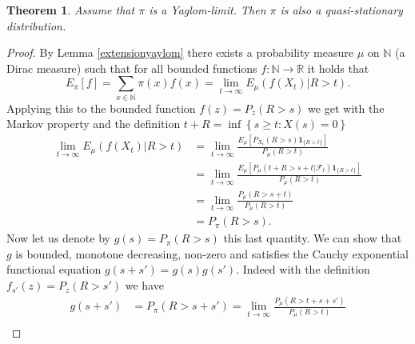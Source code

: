 \documentclass[12pt,a4paper]{scrartcl}
\newtheorem{theorem}{Theorem}[section]
\numberwithin{equation}{section}
\newcommand{\R}{\mathbb{R}} %
\newcommand{\N}{\mathbb{N}} %
\begin{document}
\begin{theorem}
Assume that $\pi$ is a Yaglom-limit. Then $\pi$ is also a quasi-stationary distribution.
\end{theorem}
\begin{proof}
By Lemma \ref{extensionyaylom} there exists a probability measure $\mu$ on $\N$ (a Dirac measure) such that for all bounded functions $f:\N \to \R$ it holds that 
$$ E_{\pi}\left[f\right] = \sum_{x \in \N} \pi\left(x\right) f\left(x\right) = \lim_{t \to \infty} E_{\mu}\left(f\left(X_t\right) | R > t \right). $$
Applying this to the bounded function $f\left(z\right) = P_z\left(R > s\right)$ we get with the Markov property and the definition $ t + R = \inf\left\{ s \geq t : X\left(s\right) = 0 \right\} $
\begin{align*}
\lim_{t \to \infty} E_{\mu} \left(f\left(X_t\right) | R > t \right) &= \lim_{t \to \infty} \frac{E_{\mu}\left[P_{X_t}\left(R > s\right) \textbf{1}_{\lbrace R > t \rbrace} \right]}{P_{\mu}\left(R > t \right)} \\
&= \lim_{t \to \infty} \frac{ E_{\mu} \left[ P_{\mu}\left(t + R > s +t | \mathcal{F}_t \right) \textbf{1}_{\lbrace R > t \rbrace}  \right] }{P_{\mu}\left(R > t \right)} \\
&= \lim_{t \to \infty} \frac{P_{\mu}\left(R > s+ t \right)}{ P_{\mu}\left( R > t\right)} \\
&= P_{\pi}\left( R > s\right).
\end{align*}
Now let us denote by $g\left(s\right) = P_{\pi}\left(R > s\right)$ this last quantity. We can show that $g$ is bounded, monotone decreasing, non-zero and satisfies the Cauchy exponential functional equation $g\left(s + s'\right) = g\left(s\right) g\left(s'\right).$ Indeed with the definition $f_{s'}\left(z\right) = P_{z}\left(R > s' \right) $ we have
\begin{align*}
g\left(s + s' \right) &= P_{\pi}\left( R > s+s'\right) = \lim_{t \to \infty} \frac{P_{\mu}\left(R > t + s + s' \right)}{P_{\mu}\left(R > t \right)} \\

\end{align*}
\end{proof}
\end{document}

